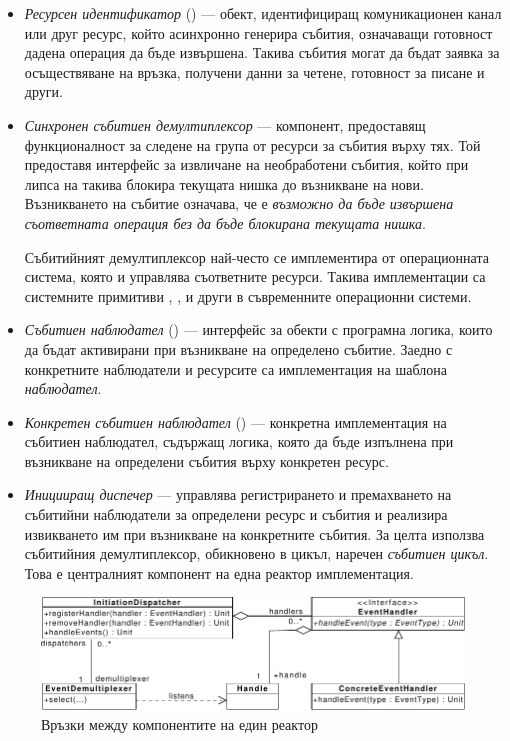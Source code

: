 \begin{itemize}
  \item \emph{Ресурсен идентификатор} () — обект, идентифициращ комуникационен канал или друг ресурс, който асинхронно генерира събития, означаващи готовност дадена операция да бъде извършена. Такива събития могат да бъдат заявка за осъществяване на връзка, получени данни за четене, готовност за писане и други.
  
  \item \emph{Синхронен събитиен демултиплексор} — компонент, предоставящ функционалност за следене на група от ресурси за събития върху тях. Той предоставя интерфейс за извличане на необработени събития, който при липса на такива блокира текущата нишка до възникване на нови. Възникването на събитие означава, че е \emph{възможно да бъде извършена съответната операция без да бъде блокирана текущата нишка}.
  
  Събитийният демултиплексор най-често се имплементира от операционната система, която и управлява съответните ресурси. Такива имплементации са системните примитиви , ,  и други в съвременните операционни системи.
  
  \item \emph{Събитиен наблюдател} () — интерфейс за обекти с програмна логика, които да бъдат активирани при възникване на определено събитие. Заедно с конкретните наблюдатели и ресурсите са имплементация на шаблона \emph{наблюдател}.
  
  \item \emph{Конкретен събитиен наблюдател} () — конкретна имплементация на събитиен наблюдател, съдържащ логика, която да бъде изпълнена при възникване на определени събития върху конкретен ресурс.
  
  \item \emph{Иницииращ диспечер} — управлява регистрирането и премахването на събитийни наблюдатели за определени ресурс и събития и реализира извикването им при възникване на конкретните събития. За целта използва събитийния демултиплексор, обикновено в цикъл, наречен \emph{събитиен цикъл}. Това е централният компонент на една реактор имплементация.
\end{itemize}

\begin{figure}
  \centering\includegraphics[width=\textwidth]{images/reactor.pdf}
  \caption{Връзки между компонентите на един реактор}
  \label{fig:reactor-components}
\end{figure}

